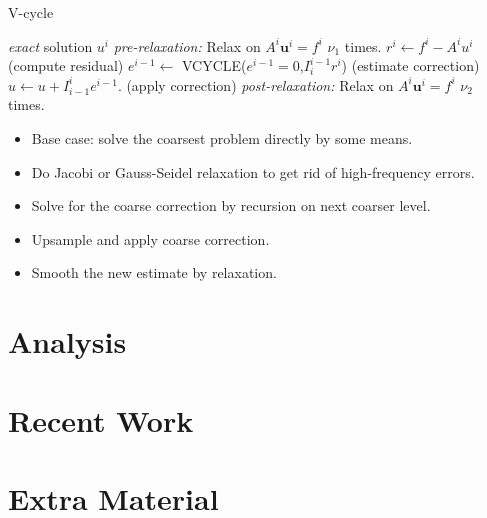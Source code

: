 \documentclass{beamer}
\begin{document}
\begin{frame}{V-cycle}
 \begin{algorithmic}[1]
   \Return \textit{exact} solution $u^i$
  \EndIf
  \State \textit{pre-relaxation:} Relax on $A^i\mathbf{u}^i = f^i$ $\nu_1$ times.
  \State $r^i \gets f^i - A^iu^i$ (compute residual)
  \State $e^{i-1} \gets$ VCYCLE($e^{i-1} = 0$,$I_i^{i-1}r^i$) (estimate correction)
  \State $u \gets u + I_{i-1}^i e^{i-1}$. (apply correction)
  \State \textit{post-relaxation:} Relax on $A^i\mathbf{u}^i = f^i$ $\nu_2$ times.
  \EndFunction
 \end{algorithmic}

 \begin{itemize}
  \item Base case: solve the coarsest problem directly by some means.
  \item Do Jacobi or Gauss-Seidel relaxation to get rid of high-frequency errors.
  \item Solve for the coarse correction by recursion on next coarser level.
  \item Upsample and apply coarse correction.
  \item Smooth the new estimate by relaxation.
 \end{itemize}
\end{frame}


\section{Analysis}%

\section{Recent Work}%

\section*{Extra Material}%
\end{document}
